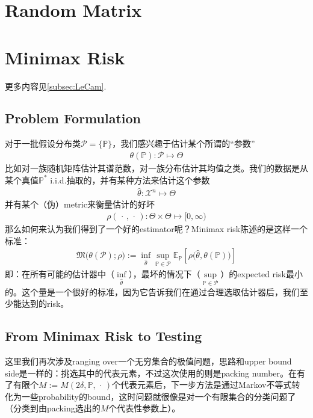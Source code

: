 \documentclass[11pt,a4paper]{ctexart}
\numberwithin{equation}{section}%
\begin{document}
\section{Random Matrix}















\section{Minimax Risk}

更多内容见\ref{subsec:LeCam}.

\subsection{Problem Formulation}
对于一批假设分布类$ \mathcal{P}=\{\mathbb{P}\} $，我们感兴趣于估计某个所谓的“参数”
\begin{align*}
    \theta(\mathbb{P}) : \mathcal{P}\mapsto \Theta
\end{align*}
比如对一族随机矩阵估计其谱范数，对一族分布估计其均值之类。我们的数据是从某个真值$ \mathbb{P}^* $ i.i.d.抽取的，并有某种方法来估计这个参数
\begin{align*}
    \hat{\theta} : \mathcal{X}^n\mapsto \Theta
\end{align*}
并有某个（伪）metric来衡量估计的好坏
\begin{align*}
    \rho (\, \cdot \, ,\, \cdot \, ) : \Theta\times \Theta \mapsto [0,\infty )
\end{align*}
那么如何来认为我们得到了一个好的estimator呢？Minimax risk陈述的是这样一个标准：
\begin{align*}
    \mathfrak{M}\big(\theta (\mathcal{P});\rho \big)  := \mathop{ \inf  }\limits_{\hat{\theta }} \mathop{ \sup  }\limits_{\mathbb{P}\in \mathcal{P}} \mathbb{E}_\mathbb{P}\left[ \rho \bigl(\hat{\theta }, \theta (\mathbb{P})\bigr) \right]   
\end{align*}
即：在所有可能的估计器中（$ \mathop{ \inf  }\limits_{\hat{\theta }} $），最坏的情况下（$ \mathop{ \sup  }\limits_{\mathbb{P}\in \mathcal{P}}  $）的expected risk最小的。这个量是一个很好的标准，因为它告诉我们在通过合理选取估计器后，我们至少能达到的risk。


\subsection{From Minimax Risk to Testing}
这里我们再次涉及ranging over一个无穷集合的极值问题，思路和upper bound side是一样的：挑选其中的代表元素，不过这次使用的则是packing number。在有了有限个$ M:=M(2\delta , \mathbb{P}, \, \cdot \, ) $个代表元素后，下一步方法是通过Markov不等式转化为一些probability的bound，这时问题就很像是对一个有限集合的分类问题了（分类到由packing选出的$ M $个代表性参数上）。
\end{document}
